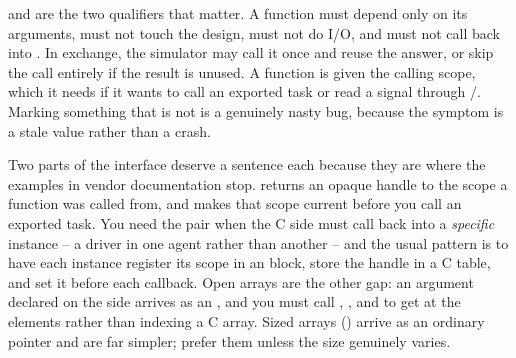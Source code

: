 
 and  are the two qualifiers that matter. A 
function must depend only on its arguments, must not touch the design, must
not do I/O, and must not call back into \SV{}. In exchange, the simulator may
call it once and reuse the answer, or skip the call entirely if the result is
unused. A  function is given the calling scope, which it needs if
it wants to call an exported task or read a signal through
/. Marking something  that is not
is a genuinely nasty bug, because the symptom is a stale value rather than a
crash.

Two parts of the interface deserve a sentence each because they are where the
examples in vendor documentation stop.  returns an opaque
handle to the \SV{} scope a  function was called from, and
 makes that scope current before you call an exported
task. You need the pair when the C side must call back into a \emph{specific}
instance -- a driver in one agent rather than another -- and the usual
pattern is to have each instance register its scope in an 
block, store the handle in a C table, and set it before each callback. Open
arrays are the other gap: an argument declared  on the
\SV{} side arrives as an , and you must call
, ,  and  to get
at the elements rather than indexing a C array. Sized arrays
() arrive as an ordinary pointer and are far simpler;
prefer them unless the size genuinely varies.

